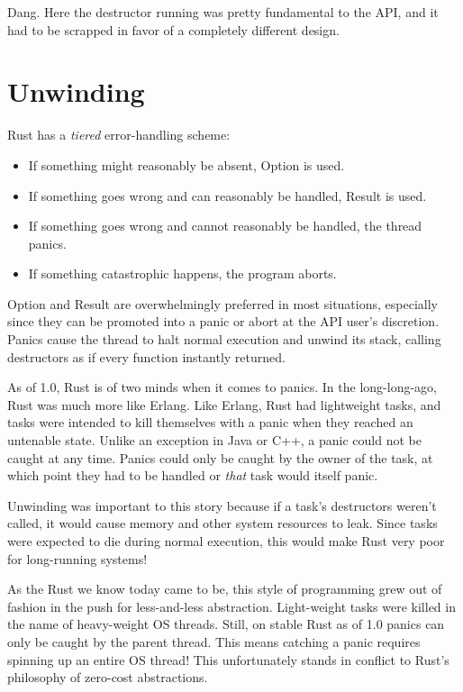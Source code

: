 \documentclass[a4paper,]{book}
\renewcommand*{\hypertarget}[3][\ar]{%
  \def\ar{#2}%
  \label{#1}%
  #3}
\providecommand{\tightlist}{%
  \setlength{\itemsep}{0pt}\setlength{\parskip}{0pt}}
\begin{document}
Dang. Here the destructor running was pretty fundamental to the API, and
it had to be scrapped in favor of a completely different design.

\hypertarget{sec--unwinding}{\chapter{Unwinding}\label{sec--unwinding}}

Rust has a \emph{tiered} error-handling scheme:

\begin{itemize}
\tightlist
\item
  If something might reasonably be absent, Option is used.
\item
  If something goes wrong and can reasonably be handled, Result is used.
\item
  If something goes wrong and cannot reasonably be handled, the thread
  panics.
\item
  If something catastrophic happens, the program aborts.
\end{itemize}

Option and Result are overwhelmingly preferred in most situations,
especially since they can be promoted into a panic or abort at the API
user's discretion. Panics cause the thread to halt normal execution and
unwind its stack, calling destructors as if every function instantly
returned.

As of 1.0, Rust is of two minds when it comes to panics. In the
long-long-ago, Rust was much more like Erlang. Like Erlang, Rust had
lightweight tasks, and tasks were intended to kill themselves with a
panic when they reached an untenable state. Unlike an exception in Java
or C++, a panic could not be caught at any time. Panics could only be
caught by the owner of the task, at which point they had to be handled
or \emph{that} task would itself panic.

Unwinding was important to this story because if a task's destructors
weren't called, it would cause memory and other system resources to
leak. Since tasks were expected to die during normal execution, this
would make Rust very poor for long-running systems!

As the Rust we know today came to be, this style of programming grew out
of fashion in the push for less-and-less abstraction. Light-weight tasks
were killed in the name of heavy-weight OS threads. Still, on stable
Rust as of 1.0 panics can only be caught by the parent thread. This
means catching a panic requires spinning up an entire OS thread! This
unfortunately stands in conflict to Rust's philosophy of zero-cost
abstractions.
\end{document}
